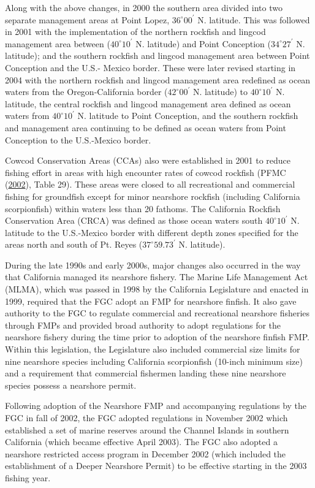 \documentclass[12pt,]{article}
\begin{document}
Along with the above changes, in 2000 the southern area divided into two
separate management areas at Point Lopez, \(36^\circ 00^\prime\) N.
latitude. This was followed in 2001 with the implementation of the
northern rockfish and lingcod management area between
(\(40^\circ 10^\prime\) N. latitude) and Point Conception
(\(34^\circ 27^\prime\) N. latitude); and the southern rockfish and
lingcod management area between Point Conception and the U.S.- Mexico
border. These were later revised starting in 2004 with the northern
rockfish and lingcod management area redefined as ocean waters from the
Oregon-California border (\(42^\circ 00^\prime\) N. latitude) to
\(40^\circ 10^\prime\) N. latitude, the central rockfish and lingcod
management area defined as ocean waters from \(40^\circ 10^\prime\) N.
latitude to Point Conception, and the southern rockfish and management
area continuing to be defined as ocean waters from Point Conception to
the U.S.-Mexico border.

Cowcod Conservation Areas (CCAs) also were established in 2001 to reduce
fishing effort in areas with high encounter rates of cowcod rockfish
(PFMC (\protect\hyperlink{ref-PFMC2002}{2002}), Table 29). These areas
were closed to all recreational and commercial fishing for groundfish
except for minor nearshore rockfish (including California scorpionfish)
within waters less than 20 fathoms. The California Rockfish Conservation
Area (CRCA) was defined as those ocean waters south
\(40^\circ 10^\prime\) N. latitude to the U.S.-Mexico border with
different depth zones specified for the areas north and south of Pt.
Reyes (\(37^\circ 59.73^\prime\) N. latitude).

During the late 1990s and early 2000s, major changes also occurred in
the way that California managed its nearshore fishery. The Marine Life
Management Act (MLMA), which was passed in 1998 by the California
Legislature and enacted in 1999, required that the FGC adopt an FMP for
nearshore finfish. It also gave authority to the FGC to regulate
commercial and recreational nearshore fisheries through FMPs and
provided broad authority to adopt regulations for the nearshore fishery
during the time prior to adoption of the nearshore finfish FMP. Within
this legislation, the Legislature also included commercial size limits
for nine nearshore species including California scorpionfish (10-inch
minimum size) and a requirement that commercial fishermen landing these
nine nearshore species possess a nearshore permit.

Following adoption of the Nearshore FMP and accompanying regulations by
the FGC in fall of 2002, the FGC adopted regulations in November 2002
which established a set of marine reserves around the Channel Islands in
southern California (which became effective April 2003). The FGC also
adopted a nearshore restricted access program in December 2002 (which
included the establishment of a Deeper Nearshore Permit) to be effective
starting in the 2003 fishing year.
\end{document}
